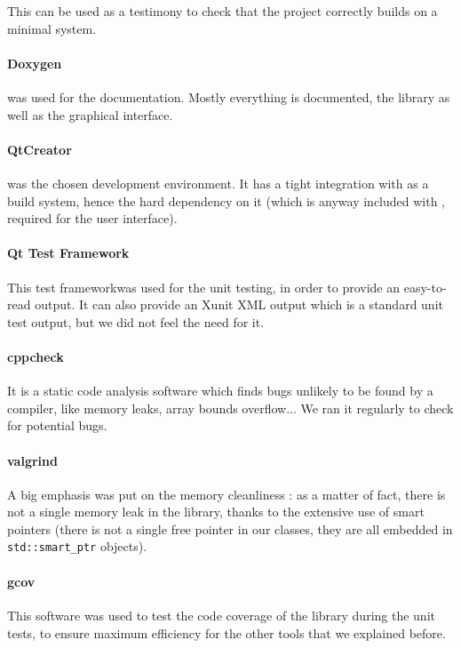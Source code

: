 This can be used as a testimony to check that the project correctly builds on a minimal system.

\paragraph{Doxygen} was used for the documentation. Mostly everything is documented, the library as well as the graphical interface.

\paragraph{QtCreator} was the chosen development environment. It has a tight integration with  as a build system, hence the hard dependency on it (which is anyway included with , required for the user interface). 

\paragraph{Qt Test Framework}
This test frameworkwas used for the unit testing, in order to provide an easy-to-read output. It can also provide an Xunit XML output which is a standard unit test output, but we did not feel the need for it. 

\paragraph{cppcheck}
It is a static code analysis software which finds bugs unlikely to be found by a compiler, like memory leaks, array bounds overflow... We ran it regularly to check for potential bugs.

\paragraph{valgrind}
A big emphasis was put on the memory cleanliness : as a matter of fact, there is not a single memory leak in the library, thanks to the extensive use of smart pointers (there is not a single free pointer in our classes, they are all embedded in \texttt{std::smart\_ptr} objects).

\paragraph{gcov}
This software was used to test the code coverage of the library during the unit tests, to ensure maximum efficiency for the other tools that we explained before.

